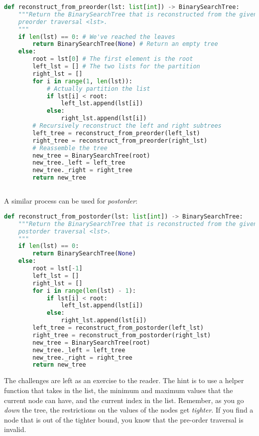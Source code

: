 \documentclass[12pt]{article}
\begin{document}
  \begin{lstlisting}[language=Python, style=mystyle]
def reconstruct_from_preorder(lst: list[int]) -> BinarySearchTree:
    """Return the BinarySearchTree that is reconstructed from the given
    preorder traversal <lst>.
    """
    if len(lst) == 0: # We've reached the leaves
        return BinarySearchTree(None) # Return an empty tree
    else:
        root = lst[0] # The first element is the root
        left_lst = [] # The two lists for the partition
        right_lst = []
        for i in range(1, len(lst)): 
            # Actually partition the list
            if lst[i] < root:
                left_lst.append(lst[i])
            else:
                right_lst.append(lst[i])
        # Recursively reconstruct the left and right subtrees
        left_tree = reconstruct_from_preorder(left_lst)
        right_tree = reconstruct_from_preorder(right_lst)
        # Reassemble the tree
        new_tree = BinarySearchTree(root)
        new_tree._left = left_tree
        new_tree._right = right_tree
        return new_tree
  \end{lstlisting}

  \subsection{}
  A similar process can be used for \textit{postorder}:

  \begin{lstlisting}[language=Python, style=mystyle]
def reconstruct_from_postorder(lst: list[int]) -> BinarySearchTree:
    """Return the BinarySearchTree that is reconstructed from the given
    postorder traversal <lst>.
    """
    if len(lst) == 0:
        return BinarySearchTree(None)
    else:
        root = lst[-1]
        left_lst = []
        right_lst = []
        for i in range(len(lst) - 1):
            if lst[i] < root:
                left_lst.append(lst[i])
            else:
                right_lst.append(lst[i])
        left_tree = reconstruct_from_postorder(left_lst)
        right_tree = reconstruct_from_postorder(right_lst)
        new_tree = BinarySearchTree(root)
        new_tree._left = left_tree
        new_tree._right = right_tree
        return new_tree
  \end{lstlisting}

  The challenges are left as an exercise to the reader. The hint is to use a helper function that takes in the list, the minimum and maximum values that the current node can have, and the current index in the list. Remember, as you go \textit{down} the tree, the restrictions on the values of the nodes get \textit{tighter}. If you find a node that is out of the tighter bound, you know that the pre-order traversal is invalid.
\end{document}
